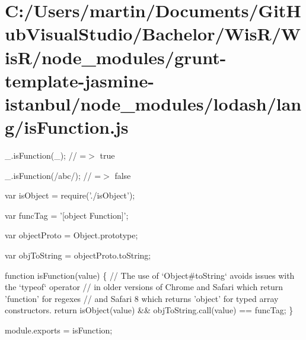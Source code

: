 \hypertarget{_c_1_2_users_2martin_2_documents_2_git_hub_visual_studio_2_bachelor_2_wis_r_2_wis_r_2node_module1d94bf6891744ab08dec8c0d5467a875}{}\section{C\+:/\+Users/martin/\+Documents/\+Git\+Hub\+Visual\+Studio/\+Bachelor/\+Wis\+R/\+Wis\+R/node\+\_\+modules/grunt-\/template-\/jasmine-\/istanbul/node\+\_\+modules/lodash/lang/is\+Function.\+js}
\+\_\+.\+is\+Function(\+\_\+); // =$>$ true

\+\_\+.\+is\+Function(/abc/); // =$>$ false


\begin{DoxyCodeInclude}
var isObject = require(\textcolor{stringliteral}{'./isObject'});

var funcTag = \textcolor{stringliteral}{'[object Function]'};

var objectProto = Object.prototype;

var objToString = objectProto.toString;

\textcolor{keyword}{function} isFunction(value) \{
  \textcolor{comment}{// The use of `Object#toString` avoids issues with the `typeof` operator}
  \textcolor{comment}{// in older versions of Chrome and Safari which return 'function' for regexes}
  \textcolor{comment}{// and Safari 8 which returns 'object' for typed array constructors.}
  \textcolor{keywordflow}{return} isObject(value) && objToString.call(value) == funcTag;
\}

module.exports = isFunction;
\end{DoxyCodeInclude}
 